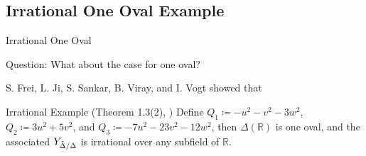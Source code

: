 \documentclass[hyperref, notheorems]{beamer}
\newcommand{\Rbb}{\mathbb{R}}
\newcommand{\Ydd}{Y_{\Tilde{\Delta} /\Delta}}
\theoremstyle{definition}
\begin{document}
\subsection{Irrational One Oval Example}

\begin{frame}{Irrational One Oval}

\begin{block}{Question:}
    What about the case for one oval?
\end{block}

S. Frei, L. Ji, S. Sankar, B. Viray, and I. Vogt showed that
\begin{block}{Irrational Example (Theorem 1.3(2), \cite{FJSVV})}
    Define $Q_1 \coloneqq  -u^2 - v^2 - 3w^2$, $Q_2 \coloneqq 3u^2 + 5v^2$, and $Q_3 \coloneqq -7u^2 - 23v^2 - 12w^2$, then $\Delta(\Rbb)$ is one oval, and the associated $\Ydd$ is irrational over any subfield of $\Rbb$.
\end{block}




    
\end{frame}


    
\end{document}
